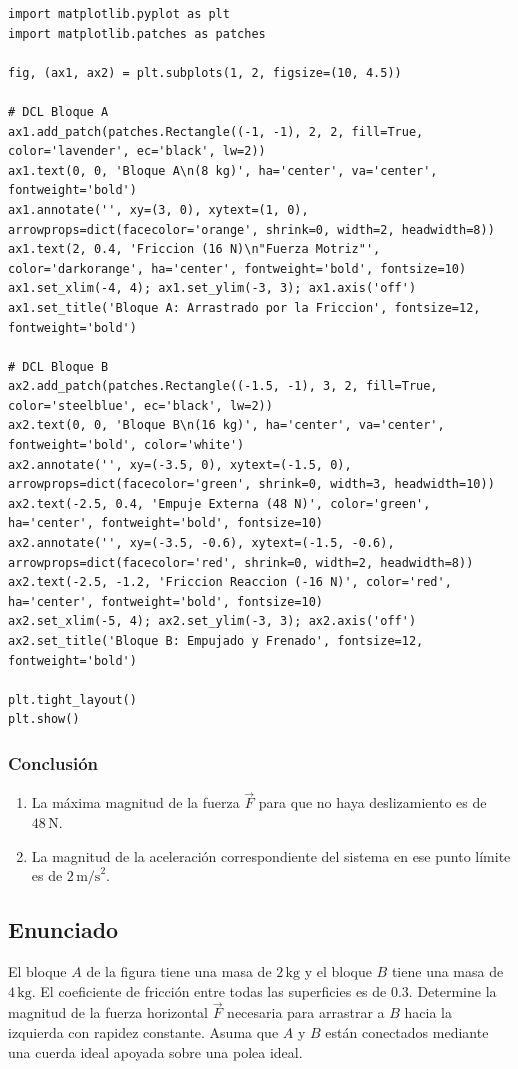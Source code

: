 \documentclass[12pt]{article}
\begin{document}
\begin{lstlisting}
import matplotlib.pyplot as plt
import matplotlib.patches as patches

fig, (ax1, ax2) = plt.subplots(1, 2, figsize=(10, 4.5))

# DCL Bloque A
ax1.add_patch(patches.Rectangle((-1, -1), 2, 2, fill=True, color='lavender', ec='black', lw=2))
ax1.text(0, 0, 'Bloque A\n(8 kg)', ha='center', va='center', fontweight='bold')
ax1.annotate('', xy=(3, 0), xytext=(1, 0), arrowprops=dict(facecolor='orange', shrink=0, width=2, headwidth=8))
ax1.text(2, 0.4, 'Friccion (16 N)\n"Fuerza Motriz"', color='darkorange', ha='center', fontweight='bold', fontsize=10)
ax1.set_xlim(-4, 4); ax1.set_ylim(-3, 3); ax1.axis('off')
ax1.set_title('Bloque A: Arrastrado por la Friccion', fontsize=12, fontweight='bold')

# DCL Bloque B
ax2.add_patch(patches.Rectangle((-1.5, -1), 3, 2, fill=True, color='steelblue', ec='black', lw=2))
ax2.text(0, 0, 'Bloque B\n(16 kg)', ha='center', va='center', fontweight='bold', color='white')
ax2.annotate('', xy=(-3.5, 0), xytext=(-1.5, 0), arrowprops=dict(facecolor='green', shrink=0, width=3, headwidth=10))
ax2.text(-2.5, 0.4, 'Empuje Externa (48 N)', color='green', ha='center', fontweight='bold', fontsize=10)
ax2.annotate('', xy=(-3.5, -0.6), xytext=(-1.5, -0.6), arrowprops=dict(facecolor='red', shrink=0, width=2, headwidth=8))
ax2.text(-2.5, -1.2, 'Friccion Reaccion (-16 N)', color='red', ha='center', fontweight='bold', fontsize=10)
ax2.set_xlim(-5, 4); ax2.set_ylim(-3, 3); ax2.axis('off')
ax2.set_title('Bloque B: Empujado y Frenado', fontsize=12, fontweight='bold')

plt.tight_layout()
plt.show()
\end{lstlisting}

\subsubsection*{Conclusión}
\begin{enumerate}
    \item[a)] La máxima magnitud de la fuerza $\vec{F}$ para que no haya deslizamiento es de $48 \, \text{N}$.
    \item[b)] La magnitud de la aceleración correspondiente del sistema en ese punto límite es de $2 \, \text{m/s}^2$.
\end{enumerate}

\newpage

\subsection*{Enunciado}
El bloque $A$ de la figura tiene una masa de $2 \, \text{kg}$ y el bloque $B$ tiene una masa de $4 \, \text{kg}$. El coeficiente de fricción entre todas las superficies es de $0.3$. Determine la magnitud de la fuerza horizontal $\vec{F}$ necesaria para arrastrar a $B$ hacia la izquierda con rapidez constante. Asuma que $A$ y $B$ están conectados mediante una cuerda ideal apoyada sobre una polea ideal.
\end{document}
